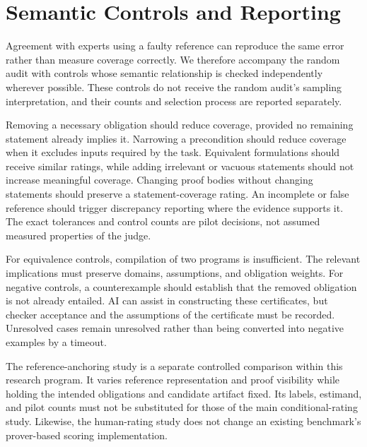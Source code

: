 \section{Semantic Controls and Reporting}
\label{sec:controls}
Agreement with experts using a faulty reference can reproduce the same error rather than measure coverage correctly.
We therefore accompany the random audit with controls whose semantic relationship is checked independently wherever possible.
These controls do not receive the random audit's sampling interpretation, and their counts and selection process are reported separately.

Removing a necessary obligation should reduce coverage, provided no remaining statement already implies it.
Narrowing a precondition should reduce coverage when it excludes inputs required by the task.
Equivalent formulations should receive similar ratings, while adding irrelevant or vacuous statements should not increase meaningful coverage.
Changing proof bodies without changing statements should preserve a statement-coverage rating.
An incomplete or false reference should trigger discrepancy reporting where the evidence supports it.
The exact tolerances and control counts are pilot decisions, not assumed measured properties of the judge.

For equivalence controls, compilation of two programs is insufficient.
The relevant implications must preserve domains, assumptions, and obligation weights.
For negative controls, a counterexample should establish that the removed obligation is not already entailed.
AI can assist in constructing these certificates, but checker acceptance and the assumptions of the certificate must be recorded.
Unresolved cases remain unresolved rather than being converted into negative examples by a timeout.

The reference-anchoring study is a separate controlled comparison within this research program.
It varies reference representation and proof visibility while holding the intended obligations and candidate artifact fixed.
Its labels, estimand, and pilot counts must not be substituted for those of the main conditional-rating study.
Likewise, the human-rating study does not change an existing benchmark's prover-based scoring implementation.

